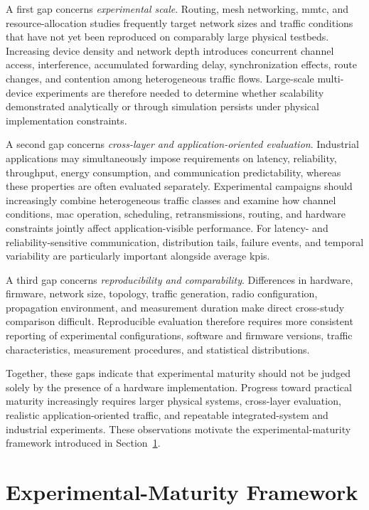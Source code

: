 \documentclass[conference]{IEEEtran}
\begin{document}
A first gap concerns \emph{experimental scale}. Routing, mesh
networking, \gls{mmtc}, and resource-allocation studies frequently
target network sizes and traffic conditions that have not yet been
reproduced on comparably large physical testbeds. Increasing device
density and network depth introduces concurrent channel access,
interference, accumulated forwarding delay, synchronization effects,
route changes, and contention among heterogeneous traffic flows.
Large-scale multi-device experiments are therefore needed to
determine whether scalability demonstrated analytically or through
simulation persists under physical implementation constraints.

A second gap concerns \emph{cross-layer and application-oriented
evaluation}. Industrial applications may simultaneously impose
requirements on latency, reliability, throughput, energy consumption,
and communication predictability, whereas these properties are often
evaluated separately. Experimental campaigns should increasingly
combine heterogeneous traffic classes and examine how channel
conditions, \gls{mac} operation, scheduling, retransmissions, routing,
and hardware constraints jointly affect application-visible
performance. For latency- and reliability-sensitive communication,
distribution tails, failure events, and temporal variability are
particularly important alongside average \glspl{kpi}.

A third gap concerns \emph{reproducibility and comparability}.
Differences in hardware, firmware, network size, topology, traffic
generation, radio configuration, propagation environment, and
measurement duration make direct cross-study comparison difficult.
Reproducible evaluation therefore requires more consistent reporting
of experimental configurations, software and firmware versions,
traffic characteristics, measurement procedures, and statistical
distributions.

Together, these gaps indicate that experimental maturity should not
be judged solely by the presence of a hardware implementation.
Progress toward practical maturity increasingly requires larger
physical systems, cross-layer evaluation, realistic
application-oriented traffic, and repeatable integrated-system and
industrial experiments. These observations motivate the
experimental-maturity framework introduced in
Section~\ref{sec:framework}.
\section{Experimental-Maturity Framework}
\label{sec:framework}
\end{document}
